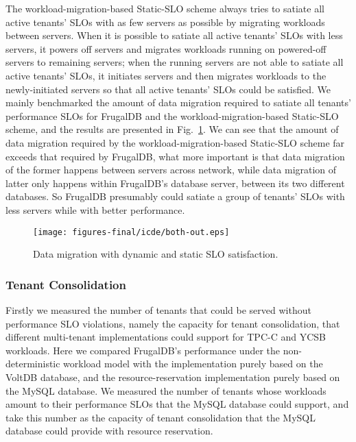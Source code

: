 The workload-migration-based Static-SLO scheme always tries to satiate all active tenants' SLOs with as few servers as possible by migrating workloads between servers. When it is possible to satiate all active tenants' SLOs with less servers, it powers off servers and migrates workloads running on powered-off servers to remaining servers; when the running servers are not able to satiate all active tenants' SLOs, it initiates servers and then migrates workloads to the newly-initiated servers so that all active tenants' SLOs could be satisfied. We mainly benchmarked the amount of data migration required to satiate all tenants' performance SLOs for FrugalDB and the workload-migration-based Static-SLO scheme, and the results are presented in Fig.~\ref{fig:Comparison-StaticSLO}. We can see that the amount of data migration required by the workload-migration-based Static-SLO scheme far exceeds that required by FrugalDB, what more important is that data migration of the former happens between servers across network, while data migration of latter only happens within FrugalDB's database server, between its two different databases. So FrugalDB presumably could satiate a group of tenants' SLOs with less servers while with better performance.


\begin{figure}[!htbp]
\begin{minipage}[b]{1.0\linewidth}
    \centering
    \texttt{[image: figures-final/icde/both-out.eps]}
    \caption{Data migration with dynamic and static SLO satisfaction.}
    \label{fig:Comparison-StaticSLO}
\end{minipage}
\end{figure}


\subsubsection{Tenant Consolidation}

Firstly we measured the number of tenants that could be served without performance SLO violations, namely the capacity for tenant consolidation, that different multi-tenant implementations could support for TPC-C and YCSB workloads. Here we compared FrugalDB's performance under the non-deterministic workload model with the implementation purely based on the VoltDB database, and the resource-reservation implementation purely based on the MySQL database. We measured the number of tenants whose workloads amount to their performance SLOs that the MySQL database could support, and take this number as the capacity of tenant consolidation that the MySQL database could provide with resource reservation.

